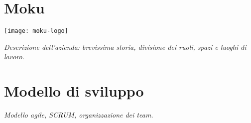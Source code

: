 \section{Moku}

\begin{center}
	\texttt{[image: moku-logo]}
\end{center}

\emph{Descrizione dell'azienda: brevissima storia, divisione dei ruoli, spazi e luoghi di lavoro.}

\section{Modello di sviluppo}
\emph{Modello agile, SCRUM, organizzazione dei team.}
